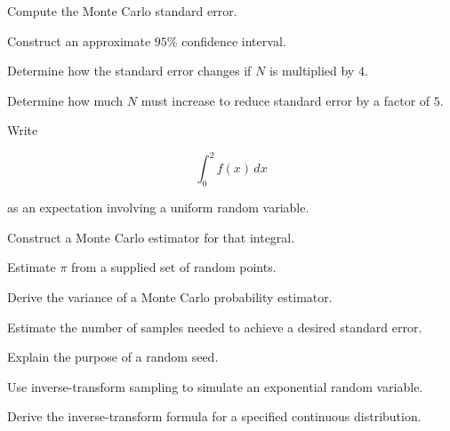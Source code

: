 \begin{exercise}[2]
Compute the Monte Carlo standard error.
\end{exercise}

\begin{exercise}[2]
Construct an approximate \(95\%\) confidence interval.
\end{exercise}

\begin{exercise}[2]
Determine how the standard error changes if \(N\) is multiplied by \(4\).
\end{exercise}

\begin{exercise}[2]
Determine how much \(N\) must increase to reduce standard error by a
factor of \(5\).
\end{exercise}

\begin{exercise}[2]
Write

\[
\int_0^2f(x)\,dx
\]

as an expectation involving a uniform random variable.
\end{exercise}

\begin{exercise}[3]
Construct a Monte Carlo estimator for that integral.
\end{exercise}

\begin{exercise}[3]
Estimate \(\pi\) from a supplied set of random points.
\end{exercise}

\begin{exercise}[3]
Derive the variance of a Monte Carlo probability estimator.
\end{exercise}

\begin{exercise}[3]
Estimate the number of samples needed to achieve a desired standard error.
\end{exercise}

\begin{exercise}[2]
Explain the purpose of a random seed.
\end{exercise}

\begin{exercise}[2]
Use inverse-transform sampling to simulate an exponential random variable.
\end{exercise}

\begin{exercise}[3]
Derive the inverse-transform formula for a specified continuous
distribution.
\end{exercise}

